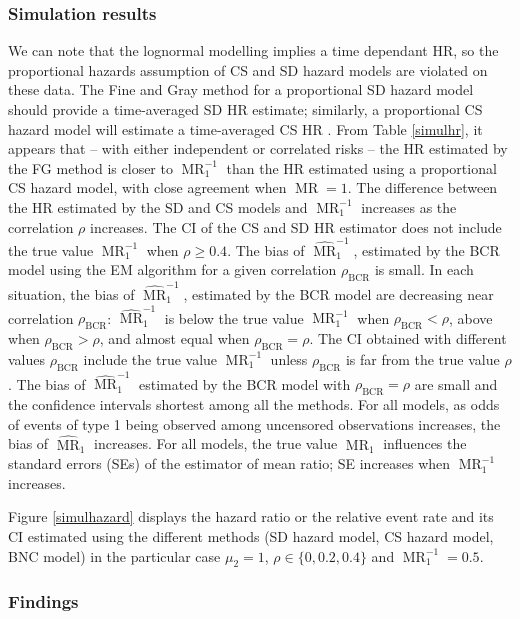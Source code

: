 \documentclass[twoside,a4paper,12pt]{article}
\def\MR{\operatorname{MR}}
\renewcommand{\hat}{\widehat}
\def\BCR{\operatorname{BCR}}
\theoremstyle{plain}
\theoremstyle{definition}
\begin{document}
\subsubsection{Simulation results}
We can note that the lognormal modelling implies a time dependant HR,
so the proportional hazards assumption of CS and SD hazard models are violated 
on these data. 
The Fine and Gray method for a proportional SD hazard model should provide a time-averaged SD HR estimate; 
similarly, a proportional CS hazard model will estimate a time-averaged CS HR \citep{Kalbfleisch1981}.
From Table \ref{simulhr}, it appears that -- with either independent or correlated risks --
the HR estimated by the FG method is closer to $\MR_{1}^{-1}$ than the HR estimated using a proportional CS hazard model, with close agreement when $\MR=1$.  
The difference between the HR estimated by the SD and CS models and 
$\MR_{1}^{-1}$ increases as the correlation $\rho$ increases. 
{The CI of the CS and SD HR estimator does not include the true value $\MR_{1}^{-1}$ 
when $\rho \geq 0.4$.} 
% 
The bias of $\hat{\MR}_{1}^{-1}$, estimated by the BCR model using the EM algorithm 
for a given correlation $\rho_{\BCR}$
is small. 
In each situation, the bias of $\hat{\MR}_{1}^{-1}$, estimated by the BCR model are decreasing near correlation $\rho_{\BCR}$: 
$\hat{\MR}_{1}^{-1}$ is below the true value $\MR_{1}^{-1}$ when $\rho_{\BCR}<\rho$, 
above when $\rho_{\BCR}>\rho$, and almost equal when $\rho_{\BCR}=\rho$. 
The CI obtained with different values $\rho_{\BCR}$ include the true value $\MR_{1}^{-1}$ unless $\rho_{\BCR}$ is far from the true value  $\rho$. 
%
The bias of $\hat{\MR}_{1}^{-1}$ estimated by the BCR model with $\rho_{\BCR}=\rho$ are {small} 
and the confidence 
intervals shortest among all the methods. For all models, as odds of events of type 1 being observed among uncensored observations increases, the bias of $\hat{\MR}_{1}$ increases.
For all models, the true value $\MR_{1}$ influences the standard errors (SEs) of 
the estimator of mean ratio; SE increases when $\MR_{1}^{-1}$ increases. 
 

Figure \ref{simulhazard} displays the hazard ratio or the relative event 
rate and its CI estimated using the different methods (SD hazard model, CS 
hazard model, BNC model) 
in the particular case $\mu_{2}=1$, $\rho \in \{0, 0.2, 0.4\}$ and 
$\MR_{1}^{-1}=0.5$.

\subsubsection{Findings}
\end{document}
